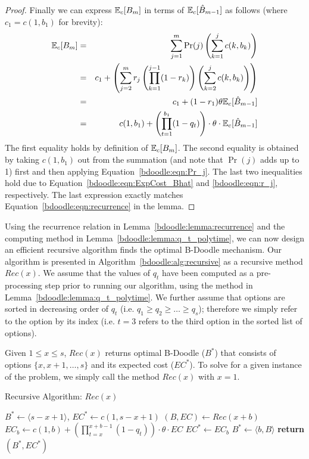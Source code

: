 \begin{proof}
	Finally we can express $\mathbb{E}_c[B_m]$ in terms of $\mathbb{E}_c[\hat{B}_{m-1}]$ as follows (where $c_1 = c(1, b_1)$ for brevity):
	\begin{eqnarray*}
	\mathbb{E}_c[B_{m}]
	&=& \sum_{j=1}^{m} \Pr(j) \left(\sum_{k=1}^{j} c(k, b_k)\right) \\
	&=& c_1 + \left(\sum_{j=2}^{m} r_j \left(\prod_{k=1}^{j-1} (1 - r_k)\right) \left(\sum_{k=2}^{j} c(k, b_k)\right) \right) \\
	&=& c_1 + (1-r_1)\theta \mathbb{E}_c[\hat{B}_{m-1}] \\
	&=& c(1, b_1) + \left(\prod_{t=1}^{b_1} (1-q_t) \right)\cdot \theta \cdot \mathbb{E}_c[\hat{B}_{m-1}]
	\end{eqnarray*}
	The first equality holds by definition of $\mathbb{E}_c[B_{m}]$. The second equality is obtained by taking $c(1, b_1)$ out from the summation (and note that $\Pr(j)$ adds up to 1) first and then applying Equation~\ref{bdoodle:eqn:Pr_j}. The last two inequalities hold due to Equation~\ref{bdoodle:eqn:ExpCost_Bhat} and \ref{bdoodle:eqn:r_j}, respectively.
	The last expression exactly  matches Equation~\ref{bdoodle:eqn:recurrence} in the lemma.
	\end{proof}

	Using the recurrence relation in Lemma~\ref{bdoodle:lemma:recurrence} and the computing method in Lemma~\ref{bdoodle:lemma:q_t_polytime}, we can now design an efficient recursive algorithm finds the optimal B-Doodle mechanism. Our algorithm is presented in Algorithm~\ref{bdoodle:alg:recursive} as a recursive method $Rec(x)$. We assume that the values of $q_t$ have been computed as a pre-processing step prior to running our algorithm, using the method in Lemma~\ref{bdoodle:lemma:q_t_polytime}. We further assume that options are sorted in decreasing order of $q_t$ (i.e. $q_1 \geq q_2 \geq \dots \geq q_{s}$); therefore we simply refer to the option by its index (i.e. $t = 3$ refers to the third option in the sorted list of options).

	Given $1 \leq x \leq s$, $Rec(x)$ returns optimal B-Doodle ($B^*$) that consists of options $\{x, x+1, \dots, s\}$ and its expected cost ($EC^*$). To solve for a given instance of the problem, we simply call the method $Rec(x)$ with $x = 1$.

	\begin{algorithm}
	\caption{Recursive Algorithm: $Rec(x)$}
	\label{bdoodle:alg:recursive}
	\begin{algorithmic}[1]
		\State ${B}^* \gets \langle s-x+1 \rangle$, $EC^* \gets c(1, s-x+1)$
			\State $({B}, EC) \gets Rec( x+b )$
			\State $EC_b \gets c(1, b) + \left(\prod_{t=x}^{x+b-1} (1 - q_t)\right)\cdot \theta \cdot EC$
				\State $EC^* \gets EC_b$
				\State $B^* \gets \langle b, {B} \rangle$
			\EndIf
		\EndFor
		\State \textbf{return} $({B}^*, EC^*)$
	\end{algorithmic}
	\end{algorithm}

